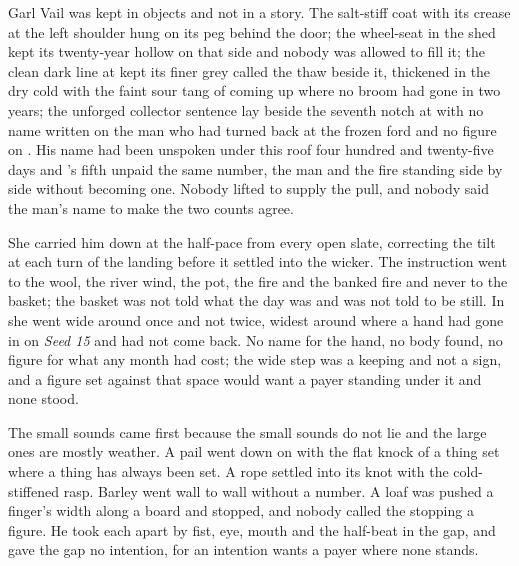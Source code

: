 Garl Vail was kept in objects and not in a story. The salt-stiff coat with its crease at the left shoulder hung on its peg behind the door; the wheel-seat in the shed kept its twenty-year hollow on that side and nobody was allowed to fill it; the clean dark line at  kept its finer grey called the thaw beside it, thickened in the dry cold with the faint sour tang of  coming up where no broom had gone in two years; the unforged collector sentence lay beside the seventh notch at  with no name written on the man who had turned back at the frozen ford and no figure on . His name had been unspoken under this roof four hundred and twenty-five days and 's fifth unpaid the same number, the man and the fire standing side by side without becoming one. Nobody lifted  to supply the pull, and nobody said the man's name to make the two counts agree.

She carried him down  at the half-pace from every open slate, correcting the tilt at each turn of the landing before it settled into the wicker. The instruction went to the wool, the river wind, the pot, the fire and the banked fire and never to the basket; the basket was not told what the day was and was not told to be still. In  she went wide around  once and not twice, widest around  where a hand had gone in on \emph{Seed 15} and had not come back. No name for the hand, no body found, no figure for what any month had cost; the wide step was a keeping and not a sign, and a figure set against that space would want a payer standing under it and none stood.

\scenebreak

The small sounds came first because the small sounds do not lie and the large ones are mostly weather. A pail went down on  with the flat knock of a thing set where a thing has always been set. A rope settled into its knot with the cold-stiffened rasp. Barley went wall to wall without a number. A loaf was pushed a finger's width along a board and stopped, and nobody called the stopping a figure. He took each apart by fist, eye, mouth and the half-beat in the gap, and gave the gap no intention, for an intention wants a payer where none stands.

